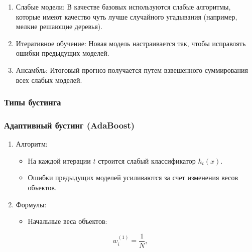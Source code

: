 \begin{enumerate}
\begin{enumerate}
\def\labelenumi{\arabic{enumi}.}
\tightlist
\item
  Слабые модели: В качестве базовых используются слабые
  алгоритмы, которые имеют качество чуть лучше случайного угадывания
  (например, мелкие решающие деревья).
\item
  Итеративное обучение: Новая модель настраивается так, чтобы
  исправлять ошибки предыдущих моделей.
\item
  Ансамбль: Итоговый прогноз получается путем взвешенного
  суммирования всех слабых моделей.
\end{enumerate}

\hypertarget{ux442ux438ux43fux44b-ux431ux443ux441ux442ux438ux43dux433ux430}{%
\subsubsection*{Типы
бустинга}\label{ux442ux438ux43fux44b-ux431ux443ux441ux442ux438ux43dux433ux430}}

\hypertarget{ux430ux434ux430ux43fux442ux438ux432ux43dux44bux439-ux431ux443ux441ux442ux438ux43dux433-adaboost}{%
\subsubsection*{Адаптивный бустинг
(AdaBoost)}\label{ux430ux434ux430ux43fux442ux438ux432ux43dux44bux439-ux431ux443ux441ux442ux438ux43dux433-adaboost}}

\begin{enumerate}
\def\labelenumi{\arabic{enumi}.}
\tightlist
\item
  Алгоритм:

  \begin{itemize}
  \tightlist
  \item
    На каждой итерации \(t\) строится слабый классификатор \(h_t(x)\).
  \item
    Ошибки предыдущих моделей усиливаются за счет изменения весов
    объектов.
  \end{itemize}
\item
  Формулы:

  \begin{itemize}
  \tightlist
  \item
    Начальные веса объектов:
  \end{itemize}
\end{enumerate}

\begin{equation} 
     w_i^{(1)} = \frac{1}{N}, 
\end{equation}


\end{enumerate}
